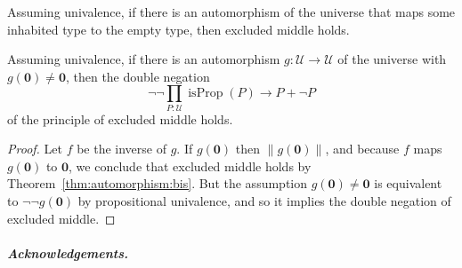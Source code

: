 \documentclass[a4paper,UKenglish]{lipics-v2016}
\newcommand{\abb}[1]{\todo[inline,caption={}]{#1}}
\newcommand{\isProp}{\operatorname{isProp}}
\newcommand{\UU}{\mathcal{U}}
\newcommand{\Empty}{\mathbf{0}}
\newcommand{\unit}{\mathbf{1}}
\begin{document}
\begin{theorem}
\label{thm:automorphism:bis}
Assuming univalence, if there is an automorphism of the universe that
maps some inhabited type to the empty type, then excluded middle
holds.
\end{theorem}

\begin{corollary}
  Assuming univalence, if there is an automorphism $g : \UU \to \UU$ of the universe
  with $g(\Empty) \ne \Empty$, then the double
  negation \[ \neg \neg \prod_{P:\UU} \isProp(P) \to P + \neg P \] of
  the principle of excluded middle holds.
\end{corollary}
\begin{proof}
  Let $f$ be the inverse of $g$. If $g(\Empty)$ then
  $\left\| g(\Empty) \right\|$, and because $f$ maps $g(\Empty)$ to
  $\Empty$, we conclude that excluded middle holds by
  Theorem~\ref{thm:automorphism:bis}.  But the assumption
  $g(\Empty) \ne \Empty$ is equivalent to $\neg \neg g(\Empty)$ by
  propositional univalence, and so it implies the double negation of
  excluded middle.
\end{proof}







\subparagraph*{Acknowledgements.}




\appendix






\end{document}
